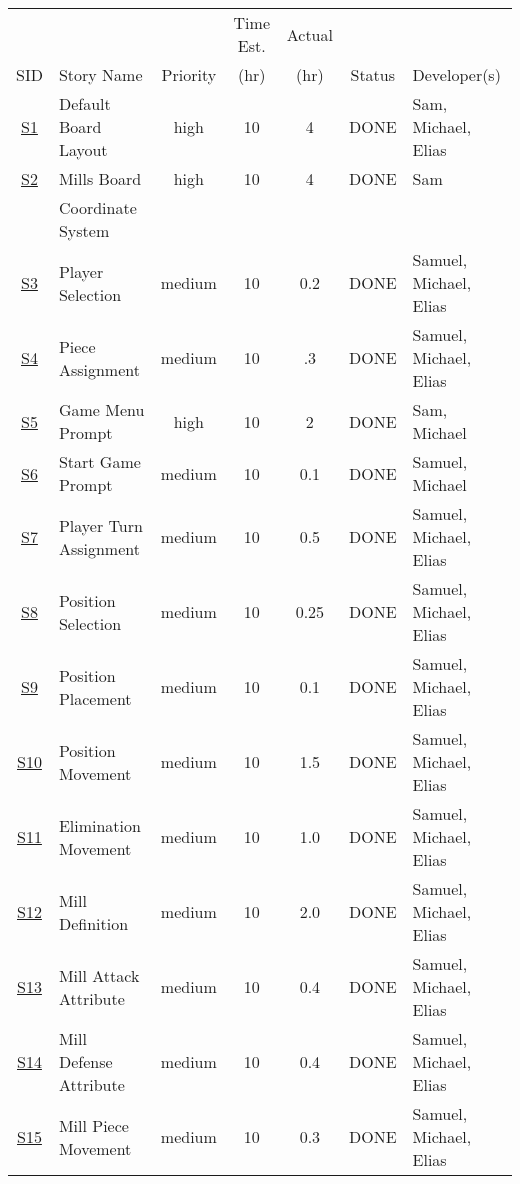 \documentclass[11pt]{article}
\begin{document}
\begin{center}
\begin{tabular}{|c|m{3.5cm}|c|c|c|c|m{2.0cm}|}
 &  &  & Time Est. & Actual &  & \\
SID & Story Name & Priority & (hr) & (hr) & Status & Developer(s)\\
\hline
\hyperref[sec:org2940434]{S1} & Default Board Layout & high & 10 & 4 & DONE & Sam, Michael, Elias\\
\hline
\hyperref[sec:org7807149]{S2} & Mills Board & high & 10 & 4 & DONE & Sam\\
 & Coordinate System &  &  &  &  & \\
\hline
\hyperref[sec:orgb298c6a]{S3} & Player Selection & medium & 10 & 0.2 & DONE & Samuel, Michael, Elias\\
\hline
\hyperref[sec:orgebcc56a]{S4} & Piece Assignment & medium & 10 & .3 & DONE & Samuel, Michael, Elias\\
\hline
\hyperref[sec:org2d34e67]{S5} & Game Menu Prompt & high & 10 & 2 & DONE & Sam, Michael\\
\hline
\hyperref[sec:orgc62b9a6]{S6} & Start Game Prompt & medium & 10 & 0.1 & DONE & Samuel, Michael\\
\hline
\hyperref[sec:org9d7b481]{S7} & Player Turn Assignment & medium & 10 & 0.5 & DONE & Samuel, Michael, Elias\\
\hline
\hyperref[sec:orga007189]{S8} & Position Selection & medium & 10 & 0.25 & DONE & Samuel, Michael, Elias\\
\hline
\hyperref[sec:org48981c8]{S9} & Position Placement & medium & 10 & 0.1 & DONE & Samuel, Michael, Elias\\
\hline
\hyperref[sec:orge12bdd0]{S10} & Position Movement & medium & 10 & 1.5 & DONE & Samuel, Michael, Elias\\
\hline
\hyperref[sec:org60852b8]{S11} & Elimination Movement & medium & 10 & 1.0 & DONE & Samuel, Michael, Elias\\
\hline
\hyperref[sec:org856022b]{S12} & Mill Definition & medium & 10 & 2.0 & DONE & Samuel, Michael, Elias\\
\hline
\hyperref[sec:org0918f25]{S13} & Mill Attack Attribute & medium & 10 & 0.4 & DONE & Samuel, Michael, Elias\\
\hline
\hyperref[sec:org8ab2eca]{S14} & Mill Defense Attribute & medium & 10 & 0.4 & DONE & Samuel, Michael, Elias\\
\hline
\hyperref[sec:orgb7d6521]{S15} & Mill Piece Movement & medium & 10 & 0.3 & DONE & Samuel, Michael, Elias\\

\end{tabular}
\end{center}
\end{document}
